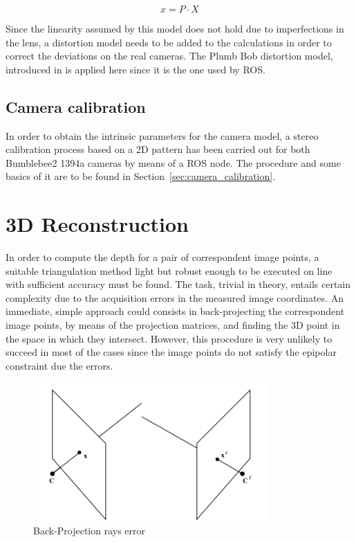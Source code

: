 \begin{equation}
x = P \cdot X
\label{eq:pinhole_model}
\end{equation}

Since the linearity assumed by this model does not hold due to imperfections in the lens, a distortion model needs to be added to the calculations in order to correct the deviations on the real cameras.
The Plumb Bob distortion model, introduced in \cite{Brown} is applied here since it is the one used by ROS.


\subsection{Camera calibration}
\label{sec:cam_calib}
In order to obtain the intrinsic parameters for the camera model, a stereo calibration process based on a 2D pattern has been carried out for both Bumblebee2 1394a cameras by means of a ROS node.
The procedure and some basics of it are to be found in Section~\ref{sec:camera_calibration}.

\section{3D Reconstruction}
In order to compute the depth for a pair of correspondent image points, a suitable triangulation method light but robust enough to be executed on line with sufficient accuracy must be found.
The task, trivial in theory, entails certain complexity due to the acquisition errors in the measured image coordinates.
An immediate, simple approach could consists in back-projecting the correspondent image points, by means of the projection matrices, and finding the 3D point in the space in which they intersect.
However, this procedure is very unlikely to succeed in most of the cases since the image points do not satisfy the epipolar constraint due the errors.

\begin{figure}[h]
    \centering
    \includegraphics[width=0.8\textwidth]{figures/back_projection}
    \caption{Back-Projection rays error}
    \label{fig:Back-Projection}
\end{figure}

